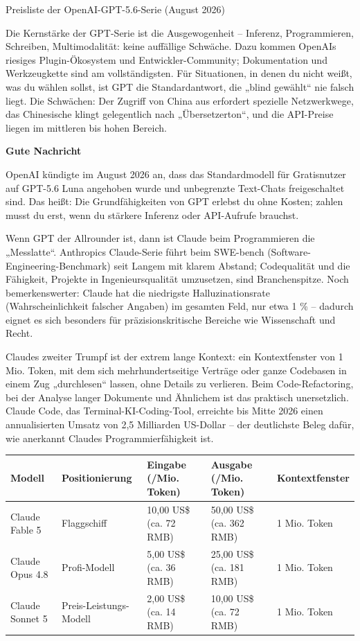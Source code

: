 \begin{center}\small\color{gray}Preisliste der OpenAI-GPT-5.6-Serie (August 2026)\end{center}

Die Kernstärke der GPT-Serie ist die Ausgewogenheit – Inferenz, Programmieren, Schreiben, Multimodalität: keine auffällige Schwäche. Dazu kommen OpenAIs riesiges Plugin-Ökosystem und Entwickler-Community; Dokumentation und Werkzeugkette sind am vollständigsten. Für Situationen, in denen du nicht weißt, was du wählen sollst, ist GPT die Standardantwort, die „blind gewählt“ nie falsch liegt. Die Schwächen: Der Zugriff von China aus erfordert spezielle Netzwerkwege, das Chinesische klingt gelegentlich nach „Übersetzerton“, und die API-Preise liegen im mittleren bis hohen Bereich.

\textbf{Gute Nachricht}\par

OpenAI kündigte im August 2026 an, dass das Standardmodell für Gratisnutzer auf GPT-5.6 Luna angehoben wurde und unbegrenzte Text-Chats freigeschaltet sind. Das heißt: Die Grundfähigkeiten von GPT erlebst du ohne Kosten; zahlen musst du erst, wenn du stärkere Inferenz oder API-Aufrufe brauchst.


Wenn GPT der Allrounder ist, dann ist Claude beim Programmieren die „Messlatte“. Anthropics Claude-Serie führt beim SWE-bench (Software-Engineering-Benchmark) seit Langem mit klarem Abstand; Codequalität und die Fähigkeit, Projekte in Ingenieursqualität umzusetzen, sind Branchenspitze. Noch bemerkenswerter: Claude hat die niedrigste Halluzinationsrate (Wahrscheinlichkeit falscher Angaben) im gesamten Feld, nur etwa 1 \% – dadurch eignet es sich besonders für präzisionskritische Bereiche wie Wissenschaft und Recht.

Claudes zweiter Trumpf ist der extrem lange Kontext: ein Kontextfenster von 1 Mio. Token, mit dem sich mehrhundertseitige Verträge oder ganze Codebasen in einem Zug „durchlesen“ lassen, ohne Details zu verlieren. Beim Code-Refactoring, bei der Analyse langer Dokumente und Ähnlichem ist das praktisch unersetzlich. Claude Code, das Terminal-KI-Coding-Tool, erreichte bis Mitte 2026 einen annualisierten Umsatz von 2,5 Milliarden US-Dollar – der deutlichste Beleg dafür, wie anerkannt Claudes Programmierfähigkeit ist.

\begin{center}
\begin{tabularx}{\linewidth}{|X|X|X|X|X|}
\hline
\textbf{Modell} & \textbf{Positionierung} & \textbf{Eingabe (/Mio. Token)} & \textbf{Ausgabe (/Mio. Token)} & \textbf{Kontextfenster} \tabularnewline
\hline
Claude Fable 5 & Flaggschiff & 10,00 US\$ (ca. 72 RMB) & 50,00 US\$ (ca. 362 RMB) & 1 Mio. Token \tabularnewline
Claude Opus 4.8 & Profi-Modell & 5,00 US\$ (ca. 36 RMB) & 25,00 US\$ (ca. 181 RMB) & 1 Mio. Token \tabularnewline
Claude Sonnet 5 & Preis-Leistungs-Modell & 2,00 US\$ (ca. 14 RMB) & 10,00 US\$ (ca. 72 RMB) & 1 Mio. Token \tabularnewline
\hline
\end{tabularx}
\end{center}

